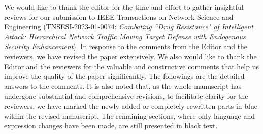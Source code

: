 \documentclass[a4paper,twoside,11pt,dvipsnames]{reviewresponse}
\begin{document}
\thispagestyle{plain}


 {\Large We would like to thank the editor for the time and effort to gather insightful reviews for our submission to IEEE Transactions on Network Science and Engineering (TNSESI-2023-01-0074: \textit{Combating ``Drug Resistance" of Intelligent Attack: Hierarchical Network Traffic Moving Target Defense with Endogenous Security Enhancement}). In response to the comments from the Editor and the reviewers, we have revised the paper extensively. We also would like to thank the Editor and the reviewers for the valuable and constructive comments that help us improve the quality of the paper significantly. The followings are the detailed answers to the comments. %
 It is also noted that, as the whole manuscript has undergone substantial and comprehensive revisions, to facilitate clarity for the reviewers, we have marked the newly added or completely rewritten parts in {\color{blue}blue\color{black}} within the revised manuscript. The remaining sections, where only language and expression changes have been made, are still presented in black text.
 }


\newpage

\end{document}
